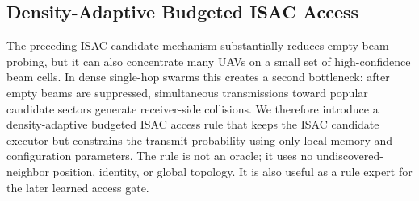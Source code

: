 
\subsection{Density-Adaptive Budgeted ISAC Access}
\label{subsec:budgeted_isac}

The preceding ISAC candidate mechanism substantially reduces empty-beam probing, but it can also concentrate many UAVs on a small set of high-confidence beam cells.
In dense single-hop swarms this creates a second bottleneck: after empty beams are suppressed, simultaneous transmissions toward popular candidate sectors generate receiver-side collisions.
We therefore introduce a density-adaptive budgeted ISAC access rule that keeps the ISAC candidate executor but constrains the transmit probability using only local memory and configuration parameters.
The rule is not an oracle; it uses no undiscovered-neighbor position, identity, or global topology.
It is also useful as a rule expert for the later learned access gate.

